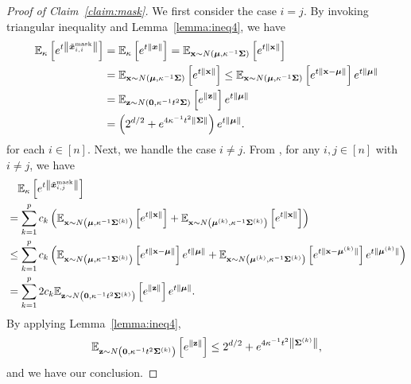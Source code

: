 \begin{proof}[Proof of Claim~\ref{claim:mask}]
We first consider the case $i = j$. By invoking triangular inequality and Lemma~\ref{lemma:ineq4}, we have
\begin{align*}
\mathbb{E}_\kappa \left[ e^{t \left \lVert \tilde{{\bm{x}}}_{i,i}^\mathrm{mask}\right \rVert} \right] 
&= \mathbb{E}_\kappa \left[ e^{t \left \lVert {\bm{x}}\right \rVert} \right] = \mathbb{E}_{{\mathbf{x}} \sim N({\bm{\mu}}, \kappa^{-1} {\bm{\Sigma}}) } \left[ e^{t \left \lVert {\mathbf{x}}\right \rVert} \right]\\
&= \mathbb{E}_{{\mathbf{x}} \sim N({\bm{\mu}}, \kappa^{-1} {\bm{\Sigma}}) } \left[ e^{t \left \lVert {\mathbf{x}}\right \rVert} \right] \leq \mathbb{E}_{{\mathbf{x}} \sim N({\bm{\mu}}, \kappa^{-1} {\bm{\Sigma}}) } \left[ e^{t \left \lVert {\mathbf{x}} - {\bm{\mu}} \right \rVert} \right] e^{t\lVert {\bm{\mu}} \rVert}\\
&= \mathbb{E}_{{\mathbf{z}} \sim N({\bm{0}}, \kappa^{-1}t^2 {\bm{\Sigma}} )} \left[e^{\lVert {\mathbf{z}} \rVert} \right] e^{t\lVert {\bm{\mu}} \rVert} \\
&= \left( 2^{d/2} + e^{4\kappa^{-1}t^2 \lVert {\bm{\Sigma}} \rVert}\right)e^{t\lVert {\bm{\mu}} \rVert}.
\end{align*}
for each $i \in [n]$. Next, we handle the case $i \neq j$. From , for any $i,j\in[n]$ with $i \neq j$, we have
\begin{align*}
&\quad \mathbb{E}_\kappa \left[ e^{t \left \lVert \tilde{{\bm{x}}}_{i,j}^\mathrm{mask}\right \rVert} \right]\\
&= \sum_{k=1}^p c_k \left( \mathbb{E}_{{\mathbf{x}} \sim N \left ({\bm{\mu}}, \kappa^{-1}{\bm{\Sigma}}^{(k)} \right)}\left [e^{t\lVert {\mathbf{x}} \rVert}\right] + \mathbb{E}_{{\mathbf{x}} \sim N\left( {\bm{\mu}}^{(k)} , \kappa^{-1} {\bm{\Sigma}}^{(k)}\right)}\left [e^{t\lVert {\mathbf{x}} \rVert}\right]\right)\\
&\leq \sum_{k=1}^p c_k \left( \mathbb{E}_{{\mathbf{x}} \sim N \left ({\bm{\mu}}, \kappa^{-1}{\bm{\Sigma}}^{(k)} \right)}\left [e^{t\lVert {\mathbf{x}} -{\bm{\mu}} \rVert}\right]e^{t\lVert {\bm{\mu}} \rVert} + \mathbb{E}_{{\mathbf{x}} \sim N\left( {\bm{\mu}}^{(k)} , \kappa^{-1} {\bm{\Sigma}}^{(k)}\right)}\left [e^{t\lVert {\mathbf{x}} -{\bm{\mu}}^{(k)}\rVert}\right]e^{t\lVert {\bm{\mu}}^{(k)}\rVert} \right)\\ 
&= \sum_{k=1}^p 2c_k \mathbb{E}_{{\mathbf{z}} \sim N\left ({\bm{0}}, \kappa^{-1}t^2 {\bm{\Sigma}}^{(k)}\right)} \left [e^{\lVert {\mathbf{z}} \rVert} \right]e^{t \lVert {\bm{\mu}} \rVert}.
\end{align*}
By applying Lemma~\ref{lemma:ineq4},
\begin{equation*}
\mathbb{E}_{{\mathbf{z}} \sim N \left ({\bm{0}}, \kappa^{-1}t^2 {\bm{\Sigma}}^{(k)}\right) }\left [e^{\lVert {\mathbf{z}} \rVert} \right] \leq 2^{d/2} + e^{4\kappa^{-1}t^2 \left \lVert {\bm{\Sigma}}^{(k)} \right\rVert },
\end{equation*}
and we have our conclusion.
\end{proof}

